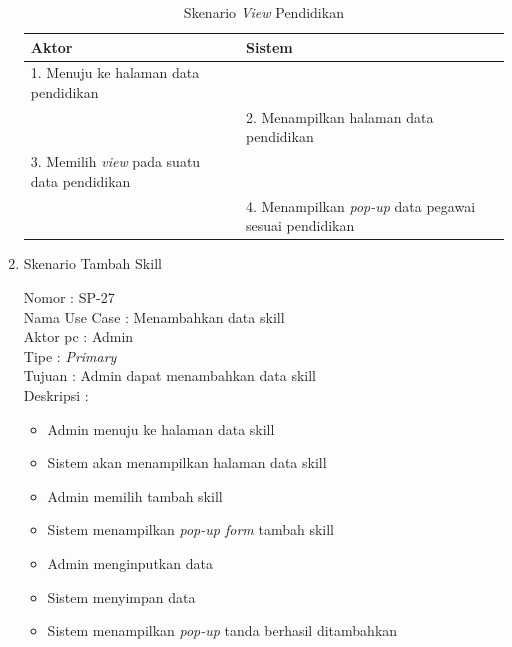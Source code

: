 \begin{enumerate}
\begin{itemize}
\end{itemize}

\begin{table}
	\caption{Skenario \textit{View} Pendidikan}
	\centering
	\begin{tabular}{ | p{53mm} | p{75mm}|}
		\hline 
		\textbf{Aktor} & \textbf{Sistem} \\
		\hline
		
		1.	Menuju ke halaman data pendidikan &  \\
		
		\hline
		
		&  2.	Menampilkan halaman data pendidikan \\
		
		\hline
		
		3. Memilih \textit{view} pada suatu data pendidikan & \\
		
		\hline
		
		& 4.	Menampilkan \textit{pop-up} data pegawai sesuai pendidikan  \\
		\hline
		
	\end{tabular}
\end{table}

\item Skenario Tambah Skill

Nomor \kern 3.6pc : SP-27 \\
Nama Use Case : Menambahkan data skill \\
Aktor  pc : Admin \\
Tipe \kern 4.6pc : \textit{Primary} \\
Tujuan \kern 3.6pc : Admin dapat menambahkan data skill \\
Deskripsi \kern 2.5pc : 

\begin{itemize}
	\item Admin menuju ke halaman data skill
	\item Sistem akan menampilkan halaman data skill
	\item Admin memilih tambah skill
	\item Sistem menampilkan \textit{pop-up form} tambah skill
	\item Admin menginputkan data
	\item Sistem menyimpan data
	\item Sistem menampilkan \textit{pop-up} tanda berhasil ditambahkan
	
\end{itemize}


\end{enumerate}
